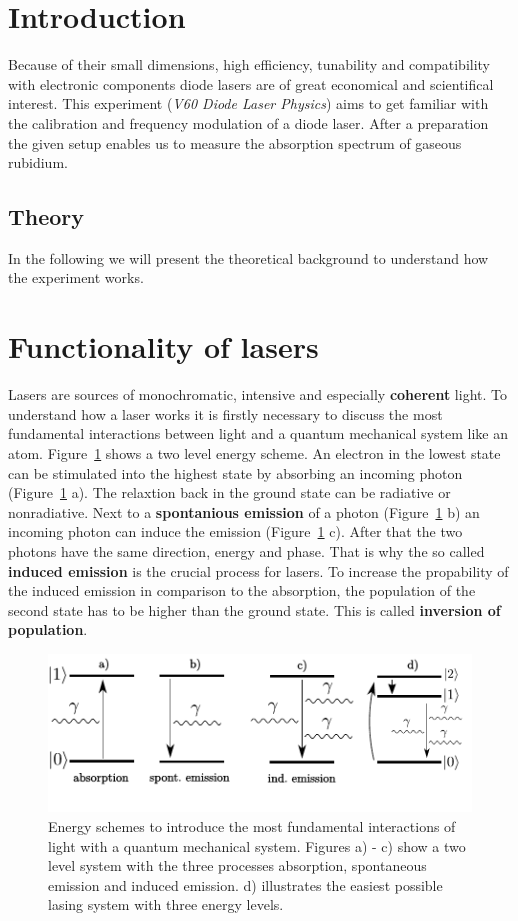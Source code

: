 \setcounter{page}{1}
\section*{Introduction}
Because of their small dimensions, high efficiency, tunability and compatibility with electronic components
diode lasers are of great economical and scientifical interest. This experiment (\emph{V60 Diode Laser Physics}) aims to get familiar
with the calibration and frequency modulation of a diode laser. After a preparation the given setup enables us to measure
the absorption spectrum of gaseous rubidium.

\subsection{Theory}
In the following we will present the theoretical background to understand how the experiment works.



\section{Functionality of lasers}
Lasers are sources of monochromatic, intensive and especially \textbf{coherent} light.
To understand how a laser works it is firstly necessary to discuss the most fundamental interactions between light and
a quantum mechanical system like an atom. Figure~\ref{fig: two_level} shows a two level energy scheme. An electron in the
lowest state can be stimulated into the highest state by absorbing an incoming photon (Figure~\ref{fig: two_level} a). The relaxtion back in the
ground state can be radiative or nonradiative. Next to a \textbf{spontanious emission} of a photon (Figure~\ref{fig: two_level} b)
an incoming photon can induce the emission (Figure~\ref{fig: two_level} c). After that the two photons have the same direction, energy and phase.
That is why the so called \textbf{induced emission} is the crucial process for lasers. To increase the propability of the induced emission in
comparison to the absorption, the population of the second state has to be higher than the ground state. This is called
\textbf{inversion of population}.

\begin{figure}
  \centering
  \includegraphics[scale = 0.9]{pics/energyscheme.pdf}
  \caption{Energy schemes to introduce the most fundamental interactions of light with a quantum mechanical system. Figures a) - c) show
  a two level system with the three processes absorption, spontaneous emission and induced emission. d) illustrates the easiest possible lasing
  system with three energy levels.}
  \label{fig: two_level}
\end{figure}


